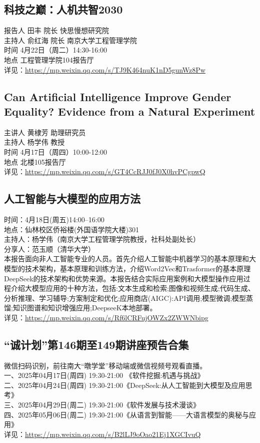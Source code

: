\documentclass[letterpaper, 12pt]{article}
\begin{document}
\begin{multicols}{2}
\subsection{科技之巅：人机共智2030}
报告人 田丰 院长 快思慢想研究院
\\主持人 俞红海 院长 南京大学工程管理学院
\\时间 4月22日（周二）14:30-16:00
\\地点 工程管理学院104报告厅
\\详见：\url{https://mp.weixin.qq.com/s/TJ9K464nuK1nD5gunWz8Pw}

\subsection{Can Artificial Intelligence Improve Gender Equality? Evidence from a Natural Experiment}
主讲人 黄棣芳  助理研究员
\\主持人 杨学伟  教授
\\时间 4月17日（周四）10:00-12:00
\\地点 北楼105报告厅
\\详见：\url{https://mp.weixin.qq.com/s/GT4CcRJJ0fJ0X0hvPCgpwQ}



\subsection{人工智能与大模型的应用方法}
时间：4月18日(周五)14:00--16:00
\\地点：仙林校区侨裕楼(外国语学院大楼)301
\\主持人：杨学伟（南京大学工程管理学院教授，社科处副处长）
\\分享人：范玉顺（清华大学）
\\本报告面向非人工智能专业的人员。首先介绍人工智能中机器学习的基本原理和大模型的技术架构，基本原理和训练方法，介绍Word2Vec和Trasformer的基本原理DeepSeek的技术架构和优势来源。本报告结合实际应用案例和大模型操作应用过程介绍大模型应用的十种方法，包括:文本生成和检索;图像和视频生成;代码生成、分析推理、学习辅导;方案制定和优化;应用商店(AIGC):API调用;模型微调;模型蒸馏;知识图谱和知识增强应用;DeepseeK本地部署。
\\详见：\url{https://mp.weixin.qq.com/s/Rf6lCRFujOWZx2ZWWNbipg}

\subsection{“诚计划”第146期至149期讲座预告合集}
微信扫码识别，前往南大“暾学堂”移动端或微信视频号观看直播。
\\一、2025年04月17日(周四) 19:30-21:00 《软件挖掘:机遇与挑战》
\\二、2025年04月24日(周四) 19:30-21:00《DeepSeek:从人工智能到大模型及应用思考》
\\三、2025年04月29日(周二) 19:30-21:00《软件发展与技术漫谈》
\\四、2025年05月06日(周二) 19:30-21:00《从语言到智能——大语言模型的奥秘与应用》
\\详见：\url{https://mp.weixin.qq.com/s/B2lLJ9oOao21Ej1XGCIvuQ}

\end{multicols}
\end{document}
